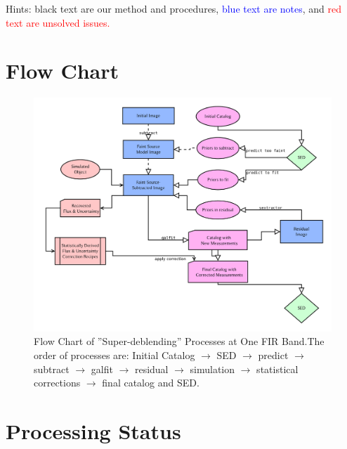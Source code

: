 \documentclass[11pt,a4paper]{article}
\begin{document}
\vspace{5cm}
Hints: black text are our method and procedures, \textcolor{blue}{blue text are notes}, and \textcolor{red}{red text are unsolved issues.}


\clearpage

\section{Flow Chart}
\label{FlowChart}

\begin{figure}[H]
	\caption{{Flow Chart of ''Super-deblending'' Processes at One FIR Band.}\newline The order of processes are: Initial Catalog $\to$ SED $\to$ predict $\to$ subtract $\to$ galfit $\to$ residual $\to$ simulation $\to$ statistical corrections $\to$ final catalog and SED.}
	\centering
	\includegraphics[width=1.05\textwidth]{FlowChartDiagram}
\end{figure}


\clearpage

\section{Processing Status}
\label{ProcessingStatus}
\end{document}
